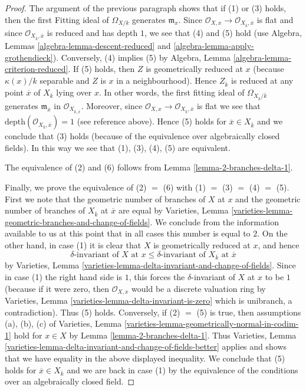 \documentclass{stacks-project}
\theoremstyle{plain}
\theoremstyle{definition}
\theoremstyle{remark}
\numberwithin{equation}{subsection}
\begin{document}
\begin{proof}
\medskip\noindent
The argument of the previous paragraph shows that if (1) or (3) holds, then
the first Fitting ideal of $\Omega_{X/k}$ generates $\mathfrak m_x$.
Since $\mathcal{O}_{X, x} \to \mathcal{O}_{X_{\overline{k}}, \overline{x}}$
is flat and since $\mathcal{O}_{X_{\overline{k}}, \overline{x}}$
is reduced and has depth $1$, we see that (4) and (5) hold
(use Algebra, Lemmas \ref{algebra-lemma-descent-reduced} and
\ref{algebra-lemma-apply-grothendieck}).
Conversely, (4) implies (5) by
Algebra, Lemma \ref{algebra-lemma-criterion-reduced}.
If (5) holds, then $Z$ is geometrically reduced at $x$
(because $\kappa(x)/k$ separable and $Z$ is $x$ in a neighbourhood).
Hence $Z_{\overline{k}}$ is reduced at any point $\overline{x}$
of $X_{\overline{k}}$ lying over $x$. In other words, the first
fitting ideal of $\Omega_{X_{\overline{k}}/\overline{k}}$ generates
$\mathfrak m_{\overline{x}}$ in $\mathcal{O}_{X_{\overline{k}, \overline{x}}}$.
Moreover, since
$\mathcal{O}_{X, x} \to \mathcal{O}_{X_{\overline{k}}, \overline{x}}$ is flat
we see that $\text{depth}(\mathcal{O}_{X_{\overline{k}}, \overline{x}}) = 1$
(see reference above).
Hence (5) holds for $\overline{x} \in X_{\overline{k}}$ and we
conclude that (3) holds (because of the equivalence over algebraically
closed fields). In this way we see that (1), (3), (4), (5)
are equivalent.

\medskip\noindent
The equivalence of (2) and (6) follows from
Lemma \ref{lemma-2-branches-delta-1}.

\medskip\noindent
Finally, we prove the equivalence of (2) $=$ (6) with
(1) $=$ (3) $=$ (4) $=$ (5). First we note that the geometric number
of branches of $X$ at $x$ and the geometric number of branches
of $X_{\overline{k}}$ at $\overline{x}$ are equal by
Varieties, Lemma
\ref{varieties-lemma-geometric-branches-and-change-of-fields}.
We conclude from the information available to us at this point
that in all cases this number is equal to $2$.
On the other hand, in case (1) it is clear that $X$ is geometrically
reduced at $x$, and hence
$$
\delta\text{-invariant of }X\text{ at }x \leq
\delta\text{-invariant of }X_{\overline{k}}\text{ at }\overline{x}
$$
by Varieties, Lemma \ref{varieties-lemma-delta-invariant-and-change-of-fields}.
Since in case (1) the right hand side is $1$, this
forces the $\delta$-invariant of $X$ at $x$ to be $1$
(because if it were zero, then $\mathcal{O}_{X, x}$ would
be a discrete valuation ring by
Varieties, Lemma \ref{varieties-lemma-delta-invariant-is-zero}
which is unibranch, a contradiction). Thus (5) holds.
Conversely, if (2) $=$ (5) is true, then assumptions (a), (b), (c) of
Varieties, Lemma \ref{varieties-lemma-geometrically-normal-in-codim-1}
hold for $x \in X$ by
Lemma \ref{lemma-2-branches-delta-1}. Thus
Varieties, Lemma
\ref{varieties-lemma-delta-invariant-and-change-of-fields-better}
applies and shows that we have equality in the above displayed inequality.
We conclude that (5) holds for $\overline{x} \in X_{\overline{k}}$
and we are back in case (1) by the equivalence of the conditions
over an algebraically closed field.
\end{proof}
\end{document}
